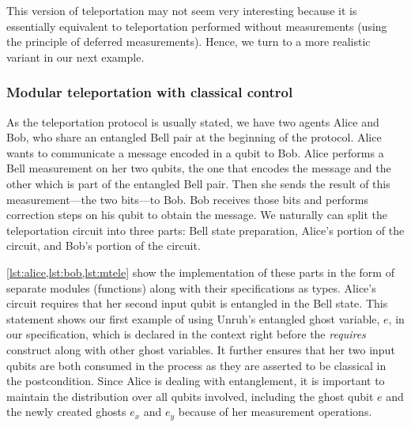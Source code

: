 This version of teleportation may not seem very interesting because it is essentially equivalent to teleportation performed without measurements (using the principle of deferred measurements). Hence, we turn to a more realistic variant in our next example.

\subsubsection{Modular teleportation with classical control}

As the teleportation protocol is usually stated, we have two agents Alice and Bob, who share an entangled Bell pair at the beginning of the protocol. Alice wants to communicate a message encoded in a qubit to Bob. Alice performs a Bell measurement on her two qubits, the one that encodes the message and the other which is part of the entangled Bell pair. Then she sends the result of this measurement---the two bits---to Bob. Bob receives those bits and performs correction steps on his qubit to obtain the message. We naturally can split the teleportation circuit into three parts: Bell state preparation, Alice's portion of the circuit, and Bob's portion of the circuit.







\cref{lst:alice,lst:bob,lst:mtele} show the implementation of these parts in the form of separate modules (functions) along with their specifications as types. Alice's circuit requires that her second input qubit is entangled in the Bell state. This statement shows our first example of using Unruh's entangled ghost variable, $e$, in our specification, which is declared in the context right before the \textit{requires} construct along with other ghost variables. It further ensures that her two input qubits are both consumed in the process as they are asserted to be classical in the postcondition. Since Alice is dealing with entanglement, it is important to maintain the distribution over all qubits involved, including the ghost qubit $e$ and the newly created ghosts $e_x$ and $e_y$ because of her measurement operations.

